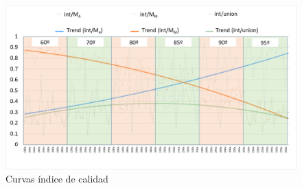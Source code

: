 \begin{figure}
         \centering
         \includegraphics[width=\textwidth]{Imagenes/grafico.png}
         \hfill
         \caption{Curvas índice de calidad}
        \label{curvas_QI}
\end{figure}

